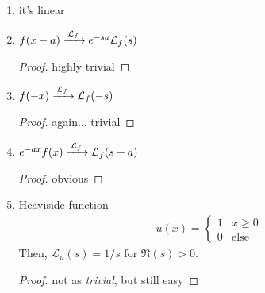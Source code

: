 \begin{enumerate}
    \item it's linear
    \item $f(x - a) \ce{->[$\mathcal{L}_f$]} e^{-sa} \mathcal{L}_f(s)$
    \begin{proof}
        highly trivial
    \end{proof}
    \item $f(-x) \ce{->[$\mathcal{L}_f$]} \mathcal{L}_f(-s)$
    \begin{proof}
        again... trivial
    \end{proof}
    \item $e^{-ax} f(x) \ce{->[$\mathcal{L}_f$]} \mathcal{L}_f(s+a)$
    \begin{proof}
        obvious
    \end{proof}
    \item Heaviside function
    \begin{align}
        u(x) = \begin{cases}
            1 & x \ge 0\\
            0 & \text{else}
        \end{cases}
    \end{align}
    Then, $\mathcal{L}_u(s) = 1/s$ for $\Re(s) > 0$.
    \begin{proof}
        not as \textit{trivial}, but still easy
    \end{proof}
\end{enumerate}



